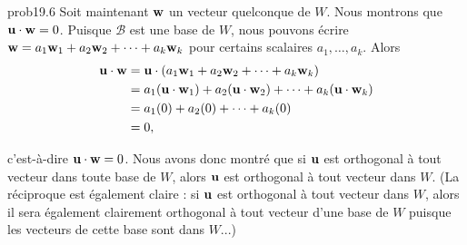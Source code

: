\begin{sol}{prob19.6}
Soit maintenant $\mathbf{w}$ un vecteur quelconque de $W$. Nous montrons que $\mathbf{u}\cdot \mathbf{w}=0$. Puisque $\mathcal B$ est une base de $W$, nous pouvons écrire $\mathbf{w}=a_1 \mathbf{w}_1 +a_2 \mathbf{w}_2 +\cdots +a_k\mathbf{w}_k$ pour certains scalaires $a_1, \dots, a_k$. Alors
\begin{equation*}
\begin{split}
 \mathbf{u}\cdot \mathbf{w} &= \mathbf{u}\cdot (a_1 \mathbf{w}_1 +a_2 \mathbf{w}_2 +\cdots +a_k\mathbf{w}_k)\\
  &=  a_1 (\mathbf{u}\cdot \mathbf{w}_1) +a_2 (\mathbf{u}\cdot \mathbf{w}_2) +\cdots +a_k (\mathbf{u}\cdot \mathbf{w}_k)  \\
  &=  a_1 (0) +a_2 (0) +\cdots +a_k (0)\\
  &= 0,\\
\end{split}\end{equation*}

c'est-à-dire $\mathbf{u}\cdot \mathbf{w}=0$. Nous avons donc montré que si $\mathbf{u}$ est orthogonal à tout vecteur dans toute base de $W$, alors $\mathbf{u}$ est orthogonal à tout vecteur dans $W$. (La réciproque est également claire : si $\mathbf{u}$ est orthogonal à tout vecteur dans $W$, alors il sera également clairement orthogonal à tout vecteur d'une base de $W$ puisque les vecteurs de cette base sont dans $W$...)
\medskip

\end{sol}
  
